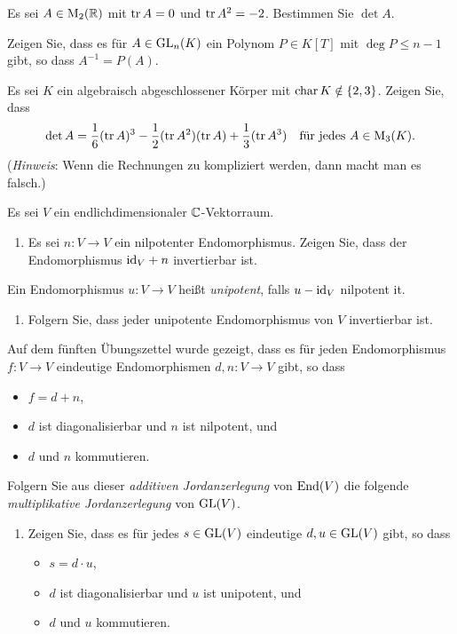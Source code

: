 \documentclass[a4paper,10pt]{scrartcl}
\begin{document}
\begin{question}
  Es sei $A \in \operatorname{M}_2(\mathbb{R})$ mit $\operatorname{tr} A = 0$ und $\operatorname{tr} A^2 = -2$.
  Bestimmen Sie $\det A$.
\end{question}


\begin{question}
  Zeigen Sie, dass es für $A \in \operatorname{GL}_n(K)$ ein Polynom $P \in K[T]$ mit $\deg P \leq n-1$ gibt, so dass $A^{-1} = P(A)$.
\end{question}


\begin{question}
  Es sei $K$ ein algebraisch abgeschlossener Körper mit $\operatorname{char} K \notin \{2,3\}$.
  Zeigen Sie, dass
  \[
    \det A = \frac{1}{6} (\operatorname{tr} A)^3 - \frac{1}{2} (\operatorname{tr} A^2)(\operatorname{tr} A) + \frac{1}{3} (\operatorname{tr} A^3)
    \quad
    \text{für jedes $A \in \operatorname{M}_3(K)$}.
  \]
  (\emph{Hinweis}: Wenn die Rechnungen zu kompliziert werden, dann macht man es falsch.)
\end{question}





\begin{question}
  Es sei $V$ ein endlichdimensionaler $\mathbb{C}$-Vektorraum.
  \begin{enumerate}
    \item
      Es sei $n \colon V \to V$ ein nilpotenter Endomorphismus.
      Zeigen Sie, dass der Endomorphismus ${\operatorname{id}_V} + n$ invertierbar ist.
  \end{enumerate}
  Ein Endomorphismus $u \colon V \to V$ heißt \emph{unipotent}, falls $u - \operatorname{id}_V$ nilpotent it.
  \begin{enumerate}[resume]
    \item
      Folgern Sie, dass jeder unipotente Endomorphismus von $V$ invertierbar ist.
  \end{enumerate}
  Auf dem fünften Übungszettel wurde gezeigt, dass es für jeden Endomorphismus $f \colon V \to V$ eindeutige Endomorphismen $d,n \colon V \to V$ gibt, so dass
  \begin{itemize}
    \item 
      $f = d + n$,
    \item
      $d$ ist diagonalisierbar und $n$ ist nilpotent, und
    \item
      $d$ und $n$ kommutieren.
  \end{itemize}
  Folgern Sie aus dieser \emph{additiven Jordanzerlegung} von $\operatorname{End}(V)$ die folgende \emph{multiplikative Jordanzerlegung} von $\operatorname{GL}(V)$.
  \begin{enumerate}[resume]
    \item
      Zeigen Sie, dass es für jedes $s \in \operatorname{GL}(V)$ eindeutige $d, u \in \operatorname{GL}(V)$ gibt, so dass
      \begin{itemize}
        \item
          $s = d \cdot u$,
        \item
          $d$ ist diagonalisierbar und $u$ ist unipotent, und
        \item
          $d$ und $u$ kommutieren.
      \end{itemize}
  \end{enumerate}
\end{question}
\end{document}
